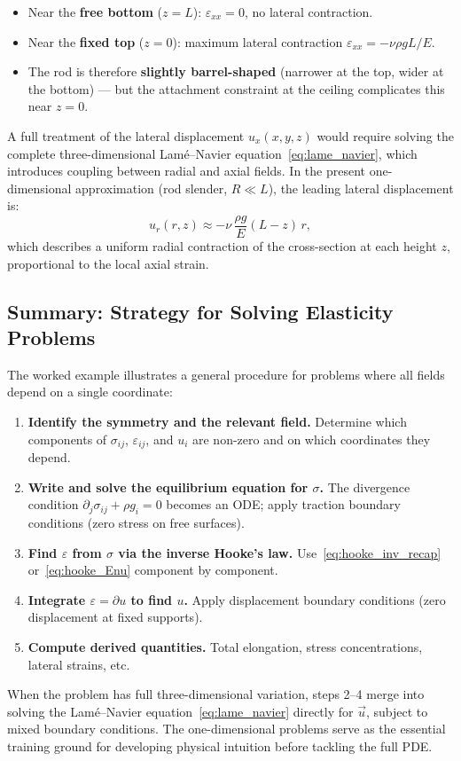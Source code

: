 \begin{itemize}
    \item Near the \textbf{free bottom} ($z=L$): $\varepsilon_{xx}=0$, no lateral contraction.
    \item Near the \textbf{fixed top} ($z=0$): maximum lateral contraction $\varepsilon_{xx}=-\nu\rho g L/E$.
    \item The rod is therefore \textbf{slightly barrel-shaped} (narrower at the top, wider at the bottom) — but the attachment constraint at the ceiling complicates this near $z=0$.
\end{itemize}

A full treatment of the lateral displacement $u_x(x,y,z)$ would require solving the complete three-dimensional Lamé–Navier equation~\eqref{eq:lame_navier}, which introduces coupling between radial and axial fields. In the present one-dimensional approximation (rod slender, $R\ll L$), the leading lateral displacement is:
\[
    u_r(r,z) \approx -\nu\,\frac{\rho g}{E}(L-z)\,r,
\]
which describes a uniform radial contraction of the cross-section at each height $z$, proportional to the local axial strain.

\subsection*{Summary: Strategy for Solving Elasticity Problems}

The worked example illustrates a general procedure for problems where all fields depend on a single coordinate:

\begin{enumerate}
    \item \textbf{Identify the symmetry and the relevant field.} Determine which components of $\sigma_{ij}$, $\varepsilon_{ij}$, and $u_i$ are non-zero and on which coordinates they depend.
    \item \textbf{Write and solve the equilibrium equation for $\sigma$.} The divergence condition $\partial_j\sigma_{ij}+\rho g_i=0$ becomes an ODE; apply traction boundary conditions (zero stress on free surfaces).
    \item \textbf{Find $\varepsilon$ from $\sigma$ via the inverse Hooke's law.} Use~\eqref{eq:hooke_inv_recap} or~\eqref{eq:hooke_Enu} component by component.
    \item \textbf{Integrate $\varepsilon = \partial u$ to find $u$.} Apply displacement boundary conditions (zero displacement at fixed supports).
    \item \textbf{Compute derived quantities.} Total elongation, stress concentrations, lateral strains, etc.
\end{enumerate}

When the problem has full three-dimensional variation, steps 2–4 merge into solving the Lamé–Navier equation~\eqref{eq:lame_navier} directly for $\vec{u}$, subject to mixed boundary conditions. The one-dimensional problems serve as the essential training ground for developing physical intuition before tackling the full PDE.
